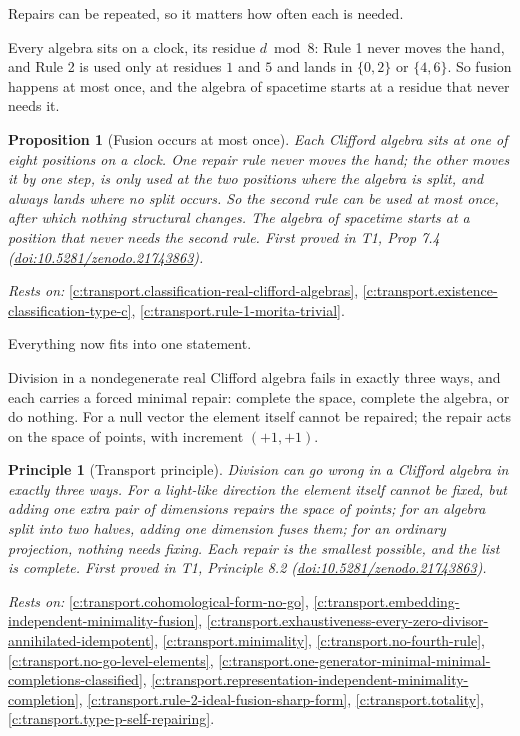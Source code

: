 \documentclass[11pt]{article}
\newtheorem{proposition}[theorem]{Proposition}
\newtheorem{principle}[theorem]{Principle}
\theoremstyle{definition}
\theoremstyle{plain}
\begin{document}
Repairs can be repeated, so it matters how often each is needed.

Every algebra sits on a clock, its residue $d \bmod 8$: Rule 1 never moves the hand, and Rule 2 is used only at residues $1$ and $5$ and lands in $\{0, 2\}$ or $\{4, 6\}$. So fusion happens at most once, and the algebra of spacetime starts at a residue that never needs it.

\begin{proposition}[Fusion occurs at most once]\label{c:transport.fusion-occurs-most-once}
Each Clifford algebra sits at one of eight positions on a clock. One repair rule never moves the hand; the other moves it by one step, is only used at the two positions where the algebra is split, and always lands where no split occurs. So the second rule can be used at most once, after which nothing structural changes. The algebra of spacetime starts at a position that never needs the second rule.
\emph{First proved in} T1, Prop 7.4 (\href{https://doi.org/10.5281/zenodo.21743863}{doi:10.5281/zenodo.21743863}).
\end{proposition}
\noindent\emph{Rests on:} \ref{c:transport.classification-real-clifford-algebras}, \ref{c:transport.existence-classification-type-c}, \ref{c:transport.rule-1-morita-trivial}.

Everything now fits into one statement.

Division in a nondegenerate real Clifford algebra fails in exactly three ways, and each carries a forced minimal repair: complete the space, complete the algebra, or do nothing. For a null vector the element itself cannot be repaired; the repair acts on the space of points, with increment $(+1,+1)$.

\begin{principle}[Transport principle]\label{c:transport.transport-principle}
Division can go wrong in a Clifford algebra in exactly three ways. For a light-like direction the element itself cannot be fixed, but adding one extra pair of dimensions repairs the space of points; for an algebra split into two halves, adding one dimension fuses them; for an ordinary projection, nothing needs fixing. Each repair is the smallest possible, and the list is complete.
\emph{First proved in} T1, Principle 8.2 (\href{https://doi.org/10.5281/zenodo.21743863}{doi:10.5281/zenodo.21743863}).
\end{principle}
\noindent\emph{Rests on:} \ref{c:transport.cohomological-form-no-go}, \ref{c:transport.embedding-independent-minimality-fusion}, \ref{c:transport.exhaustiveness-every-zero-divisor-annihilated-idempotent}, \ref{c:transport.minimality}, \ref{c:transport.no-fourth-rule}, \ref{c:transport.no-go-level-elements}, \ref{c:transport.one-generator-minimal-minimal-completions-classified}, \ref{c:transport.representation-independent-minimality-completion}, \ref{c:transport.rule-2-ideal-fusion-sharp-form}, \ref{c:transport.totality}, \ref{c:transport.type-p-self-repairing}.
\end{document}
